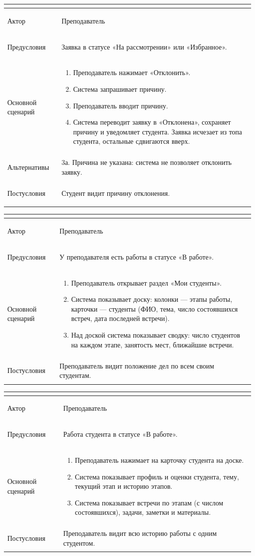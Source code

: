 \documentclass[a4paper,12pt]{article}
\newenvironment{ucd}[3]{%
  \needspace{10\baselineskip}
  \begin{longtable}{|>{\bfseries\raggedright\arraybackslash}p{3.0cm}|p{11.8cm}|}
  \hline
  \multicolumn{2}{|l|}{\textbf{#1.\ #2}}\\ \hline
  Актор & #3\\ \hline
}{\end{longtable}}
\newcommand{\steps}[1]{\begin{enumerate}[nosep,leftmargin=*]#1\end{enumerate}}
\begin{document}
\begin{ucd}{UC-17}{Отклонить заявку с указанием причины}{Преподаватель}
Предусловия & Заявка в статусе «На рассмотрении» или «Избранное».\\ \hline
Основной сценарий & \steps{
 \item Преподаватель нажимает «Отклонить».
 \item Система запрашивает причину.
 \item Преподаватель вводит причину.
 \item Система переводит заявку в «Отклонена», сохраняет причину и уведомляет студента. Заявка исчезает из топа студента, остальные сдвигаются вверх.}\\ \hline
Альтернативы & 3а. Причина не указана: система не позволяет отклонить заявку.\\ \hline
Постусловия & Студент видит причину отклонения.\\ \hline
\end{ucd}

\begin{ucd}{UC-18}{Просмотреть доску работ по этапам и сводку}{Преподаватель}
Предусловия & У преподавателя есть работы в статусе «В работе».\\ \hline
Основной сценарий & \steps{
 \item Преподаватель открывает раздел «Мои студенты».
 \item Система показывает доску: колонки — этапы работы, карточки — студенты (ФИО, тема, число состоявшихся встреч, дата последней встречи).
 \item Над доской система показывает сводку: число студентов на каждом этапе, занятость мест, ближайшие встречи.}\\ \hline
Постусловия & Преподаватель видит положение дел по всем своим студентам.\\ \hline
\end{ucd}

\begin{ucd}{UC-19}{Открыть карточку студента}{Преподаватель}
Предусловия & Работа студента в статусе «В работе».\\ \hline
Основной сценарий & \steps{
 \item Преподаватель нажимает на карточку студента на доске.
 \item Система показывает профиль и оценки студента, тему, текущий этап и историю этапов.
 \item Система показывает встречи по этапам (с числом состоявшихся), задачи, заметки и материалы.}\\ \hline
Постусловия & Преподаватель видит всю историю работы с одним студентом.\\ \hline
\end{ucd}
\end{document}

